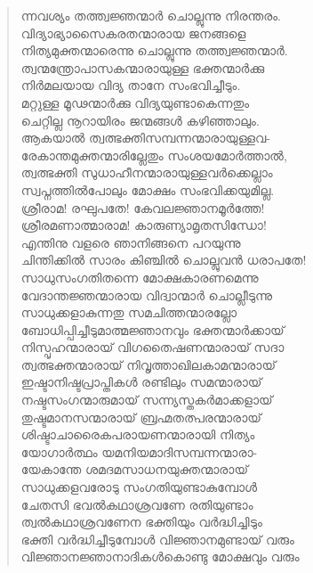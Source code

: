 \begin{verse}
ന്നവശ്യം തത്ത്വജ്ഞന്മാര്‍ ചൊല്ലുന്നു നിരന്തരം.\\
വിദ്യാഭ്യാസൈകരതന്മാരായ ജനങ്ങളെ\\
നിത്യമുക്തന്മാരെന്നു ചൊല്ലുന്നു തത്ത്വജ്ഞന്മാര്‍.\\
ത്വന്മന്ത്രോപാസകന്മാരായുള്ള ഭക്തന്മാര്‍ക്കു\\
നിര്‍മലയായ വിദ്യ താനേ സംഭവിച്ചീടും.\\
മറ്റുള്ള മൂഢന്മാര്‍ക്കു വിദ്യയുണ്ടാകെന്നതും\\
ചെറ്റില്ല നൂറായിരം ജന്മങ്ങള്‍ കഴിഞ്ഞാലും.\\
ആകയാല്‍ ത്വത്ഭക്തിസമ്പന്നന്മാരായുള്ളവ-\\
രേകാന്തമുക്തന്മാരില്ലേതും സംശയമോര്‍ത്താല്‍,\\
ത്വത്ഭക്തി സുധാഹീനന്മാരായുള്ളവര്‍ക്കെല്ലാം\\
സ്വപ്നത്തില്‍പോലും മോക്ഷം സംഭവിക്കയുമില്ല.\\
ശ്രീരാമ! രഘുപതേ! കേവലജ്ഞാനമൂര്‍ത്തേ!\\
ശ്രീരമണാത്മാരാമ! കാരുണ്യാമൃതസിന്ധോ!\\
എന്തിനു വളരെ ഞാനിങ്ങനെ പറയുന്നു\\
ചിന്തിക്കില്‍ സാരം കിഞ്ചില്‍ ചൊല്ലുവന്‍ ധരാപതേ!\\
സാധുസംഗതിതന്നെ മോക്ഷകാരണമെന്നു\\
വേദാന്തജ്ഞന്മാരായ വിദ്വാന്മാര്‍ ചൊല്ലീടുന്നു\\
സാധുക്കളാകുന്നതു സമചിത്തന്മാരല്ലോ\\
ബോധിപ്പിച്ചീടുമാത്മജ്ഞാനവും ഭക്തന്മാര്‍ക്കായ്\\
നിസ്പൃഹന്മാരായ് വിഗതൈഷണന്മാരായ് സദാ\\
ത്വത്ഭക്തന്മാരായ് നിവൃത്താഖിലകാമന്മാരായ്\\
ഇഷ്ടാനിഷ്ടപ്രാപ്തികള്‍ രണ്ടിലും സമന്മാരായ്\\
നഷ്ടസംഗന്മാരുമായ് സന്ന്യസ്തകര്‍മാക്കളായ്\\
തുഷ്ടമാനസന്മാരായ് ബ്രഹ്മതത്പരന്മാരായ്\\
ശിഷ്ടാചാരൈകപരായണന്മാരായി നിത്യം\\
യോഗാര്‍ത്ഥം യമനിയമാദിസമ്പന്നന്മാരാ-\\
യേകാന്തേ ശമദമസാധനയുക്തന്മാരായ്\\
സാധുക്കളവരോടു സംഗതിയുണ്ടാകുമ്പോള്‍\\
ചേതസി ഭവല്‍കഥാശ്രവണേ രതിയുണ്ടാം\\
ത്വല്‍കഥാശ്രവണേന ഭക്തിയും വര്‍ദ്ധിച്ചിടും\\
ഭക്തി വര്‍ദ്ധിച്ചീടുമ്പോള്‍ വിജ്ഞാനമുണ്ടായ് വരും\\
വിജ്ഞാനജ്ഞാനാദികള്‍കൊണ്ടു മോക്ഷവും വരും\\

\end{verse}
